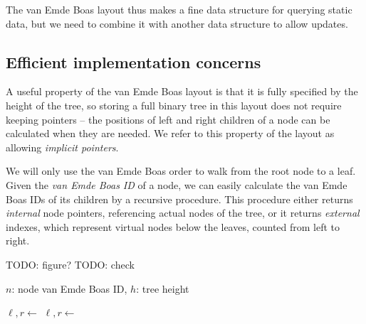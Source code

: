 The van Emde Boas layout thus makes a fine data structure for querying static
data, but we need to combine it with another data structure to allow updates.

\subsection{Efficient implementation concerns}
A useful property of the van Emde Boas layout is that it is fully specified
by the height of the tree, so storing a full binary tree in this layout does
not require keeping pointers -- the positions of left and right children
of a node can be calculated when they are needed. We refer to this property
of the layout as allowing \textit{implicit pointers}.

We will only use the van Emde Boas order to walk from the root node to a leaf.
Given the \textit{van Emde Boas ID} of a node,
we can easily calculate the van Emde Boas IDs of its children by
a recursive procedure. This procedure either returns \textit{internal} node
pointers, referencing actual nodes of the tree, or it returns \textit{external}
indexes, which represent virtual nodes below the leaves, counted from left
to right.

TODO: figure?
TODO: check
\begin{algorithmic}
 {$n$: node van Emde Boas ID, $h$: tree height}
	  \EndIf

	 
	 

		\State $\ell, r \gets$ 
			\State {}
		\Else{}
			\State {}
		\EndIf
	\Else
		\State $\ell,r\gets$ 
			\State {}
		\Else
			 
			\State {}
		\EndIf
	\EndIf
\EndFunction
\end{algorithmic}

